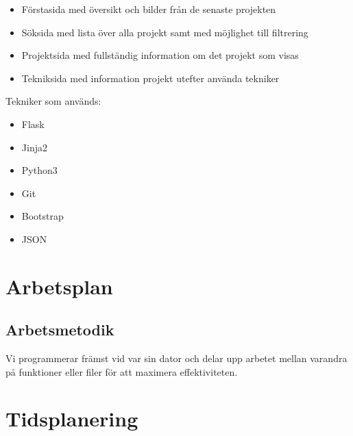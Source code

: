 \documentclass{TDP003mall}
\begin{document}
\begin{itemize}
\item Förstasida med översikt och bilder från de senaste projekten
\item Söksida med lista över alla projekt samt med möjlighet till filtrering
\item Projektsida med fullständig information om det projekt som visas
\item Tekniksida med information projekt utefter använda tekniker
\end{itemize}
\newpage
Tekniker som används:
\begin{itemize}
\item Flask
\item Jinja2
\item Python3
\item Git
\item Bootstrap
\item JSON
\end{itemize}

\section{Arbetsplan}

\subsection{Arbetsmetodik}
Vi programmerar främst vid var sin dator och delar upp arbetet mellan
varandra på funktioner eller filer för att maximera effektiviteten.

\section{Tidsplanering}
\end{document}
